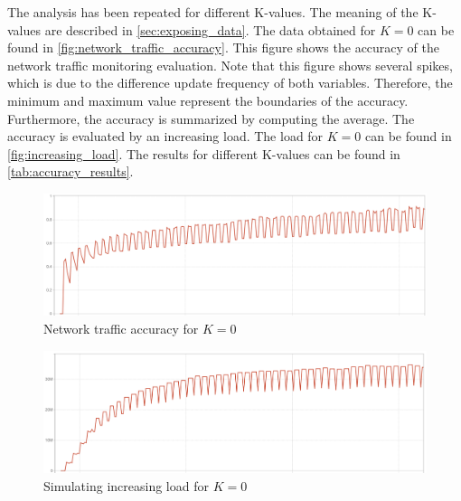 \noindent
The analysis has been repeated for different K-values. The meaning of the K-values are described in \autoref{sec:exposing_data}. The data obtained for $K = 0$ can be found in \autoref{fig:network_traffic_accuracy}. This figure shows the accuracy of the network traffic monitoring evaluation. Note that this figure shows several spikes, which is due to the difference update frequency of both variables. Therefore, the minimum and maximum value represent the boundaries of the accuracy. Furthermore, the accuracy is summarized by computing the average. The accuracy is evaluated by an increasing load. The load for $K = 0$ can be found in \autoref{fig:increasing_load}. The results for different K-values can be found in \autoref{tab:accuracy_results}.

\begin{figure}
    \centering
    \includegraphics[width=\textwidth]{gfx/traffic_network_accuracy}
    \caption{Network traffic accuracy for $K = 0$}
    \label{fig:network_traffic_accuracy}
\end{figure}

\begin{figure}
    \centering
    \includegraphics[width=\textwidth]{gfx/increasing_load}
    \caption{Simulating increasing load for $K = 0$}
    \label{fig:increasing_load}
\end{figure}

